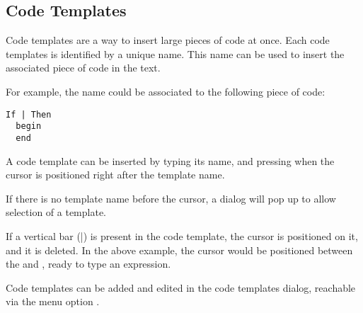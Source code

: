 \subsection{Code Templates}
Code templates are a way to insert large pieces of code at once. Each 
code templates is identified by a unique name. This name can be used to
insert the associated piece of code in the text.

For example, the name  could be associated to the following
piece of code:
\begin{verbatim}
If | Then
  begin
  end
\end{verbatim}
A code template can be inserted by typing its name, and pressing 
when the cursor is positioned right after the template name.

If there is no template name before the cursor, a dialog will pop up to
allow selection of a template.

If a vertical bar (|) is present in the code template, the cursor is positioned
on it, and it is deleted. In the above example, the cursor would be
positioned between the  and , ready to type an expression.

Code templates can be added and edited in the code templates dialog, reachable via
the menu option . 

